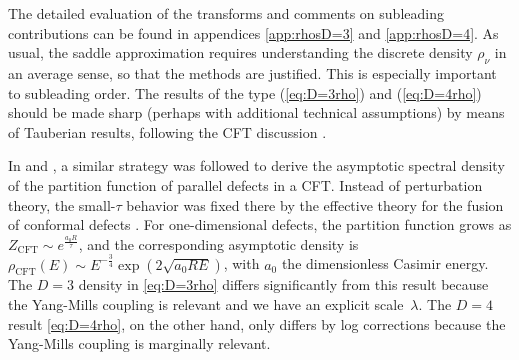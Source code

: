 \documentclass[
 reprint,
 amsmath,
 pre,
 amssymb,
 nofootinbib,
 aps,
 longbibliography,
]{revtex4-1}
\newcommand{\<}{{\langle}}
\renewcommand{\>}{{\rangle}}
\begin{document}
The detailed evaluation of the transforms and comments on subleading contributions can be found in appendices \ref{app:rhosD=3} and \ref{app:rhosD=4}.
As usual, the saddle approximation requires understanding the discrete density $\rho_\nu$ in an average sense, so that the methods are justified. This is especially important to subleading order. The results of the type (\ref{eq:D=3rho}) and (\ref{eq:D=4rho}) should be made sharp (perhaps with additional technical assumptions) by means of Tauberian results, following the CFT discussion \cite{Pappadopulo:2012jk,Das:2017vej,Qiao:2017xif,Mukhametzhanov:2018zja,Mukhametzhanov:2019pzy,Pal:2019zzr,Mukhametzhanov:2020swe,Das:2020uax}.

In \cite{Diatlyk:2024qpr} and \cite{Kravchuk:2024qoh}, a similar strategy was followed to derive the asymptotic spectral density of the partition function of parallel defects in a CFT. Instead of perturbation theory, the small-$\tau$ behavior was fixed there by the effective theory for the fusion of conformal defects \cite{Diatlyk:2024zkk,Diatlyk:2024qpr,Kravchuk:2024qoh,Cuomo:2024psk}.
For one-dimensional defects, the partition function grows as $Z_{\text{CFT}}\sim e^{\frac{a_0 R}{\tau}}$, and the corresponding asymptotic density is $\rho_{\text{CFT}}(E) \sim E^{-\frac{3}{4}}\exp\left(2\sqrt{a_0 R E}\right)$, with $a_0$ the dimensionless Casimir energy. The $D=3$ density in \eqref{eq:D=3rho} differs significantly from this result because the Yang-Mills coupling is relevant and we have an explicit scale~$\lambda$. The $D=4$ result \eqref{eq:D=4rho}, on the other hand, only differs by log corrections because the Yang-Mills coupling is marginally relevant.
\end{document}
